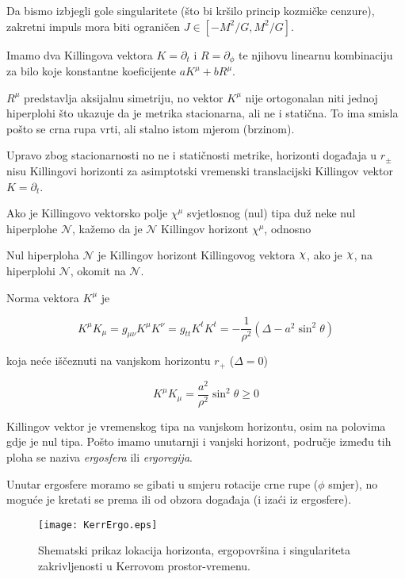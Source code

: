 Da bismo izbjegli gole singularitete (što bi kršilo princip kozmičke cenzure), zakretni impuls mora biti ograničen $J\in[-M^2/G,M^2/G]$.

Imamo dva Killingova vektora $K=\partial_t$ i $R=\partial_\phi$ te njihovu linearnu kombinaciju za bilo koje konstantne koeficijente $aK^\mu+bR^\mu$.

\noindent $R^\mu$ predstavlja aksijalnu simetriju, no vektor $K^\mu$ nije ortogonalan niti jednoj hiperplohi što ukazuje da je metrika stacionarna, ali ne i statična. To ima smisla pošto se crna rupa vrti, ali stalno istom mjerom (brzinom).

Upravo zbog stacionarnosti no ne i statičnosti metrike, horizonti događaja u $r_\pm$ nisu Killingovi horizonti za asimptotski vremenski translacijski Killingov vektor $K=\partial_t$.

Ako je Killingovo vektorsko polje $\chi^\mu$ svjetlosnog (nul) tipa duž neke nul hiperplohe $\mathcal{N}$, kažemo da je $\mathcal{N}$ Killingov horizont $\chi^\mu$, odnosno

\begin{mydef*}
Nul hiperploha $\mathcal{N}$ je Killingov horizont Killingovog vektora $\rchi$, ako je $\rchi$, na hiperplohi $\mathcal{N}$, okomit na $\mathcal{N}$.
\end{mydef*}

\noindent Norma vektora $K^\mu$ je 

\begin{equation}
K^\mu K_\mu=g_{\mu\nu}K^\mu K^\nu=g_{tt}K^tK^t=-\frac{1}{\rho^2}(\Delta-a^2\sin^2\theta)
\end{equation}

\noindent koja neće iščeznuti na vanjskom horizontu $r_+$ ($\Delta=0$)

\begin{equation}
K^\mu K_\mu=\frac{a^2}{\rho^2}\sin^2\theta\ge 0
\end{equation}

Killingov vektor je vremenskog tipa na vanjskom horizontu, osim na polovima gdje je nul tipa. Pošto imamo unutarnji i vanjski horizont, područje između tih ploha se naziva \emph{ergosfera} ili \emph{ergoregija}.

Unutar ergosfere moramo se gibati u smjeru rotacije crne rupe ($\phi$ smjer), no moguće je kretati se prema ili od obzora događaja (i izaći iz ergosfere).

\begin{figure}[h!]
\centering
\texttt{[image: KerrErgo.eps]}
\caption[Shematski prikaz Kerrovog prostor-vremena]{Shematski prikaz lokacija horizonta, ergopovršina i singulariteta zakrivljenosti u Kerrovom prostor-vremenu.}
\label{fig:kerrergo}
\end{figure}

